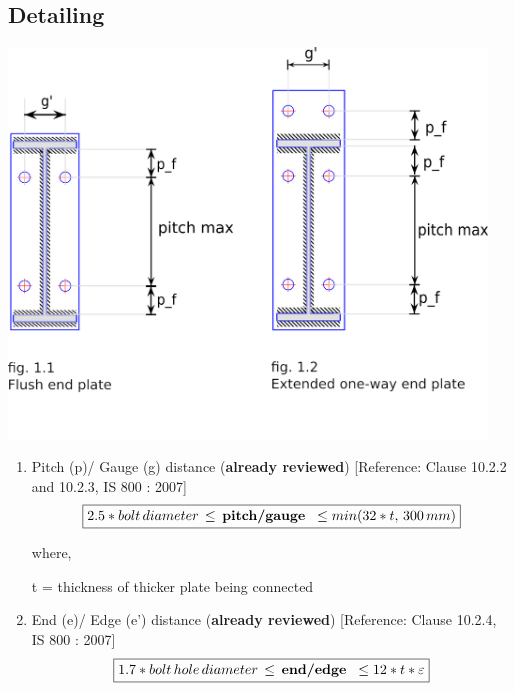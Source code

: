 \documentclass[11.5pt,a4paper,oneside]{report}
\begin{document}
\begin{Form}
\chapter{Detailing}
		
		{\centering
		\includegraphics[width=5in]{svg_drawingFPEOW.png} \\}
		
			\begin{enumerate}
				
				\item \large  {Pitch (p)/ Gauge (g) distance (\textbf{already reviewed}) [Reference: Clause 10.2.2 and 10.2.3, IS 800 : 2007]} \\
				\begin{equation}
				\boxed{ 2.5 * bolt\, diameter\, \leq \textbf{\,pitch/gauge \,} \leq min(32 * t,\, 300\, mm) }
				\end{equation}
				
				\hspace{10mm}
				where,
				
				\hspace{30mm}
				t = thickness of thicker plate being connected 
				
			\vspace{2mm}
				
				\item \large {End (e)/ Edge (e') distance (\textbf{already reviewed}) [Reference: Clause 10.2.4, IS 800 : 2007]} \\
				\begin{equation}
				\boxed{ 1.7 * bolt\,hole\, diameter\, \leq \textbf{\,end/edge \,} \leq 12*t*\varepsilon }
				\end{equation}
				

\end{enumerate}
\end{Form}
\end{document}

